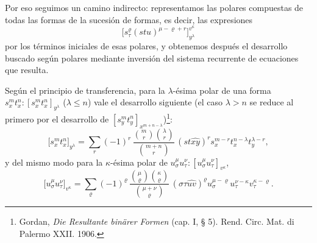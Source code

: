 \documentclass[11pt]{article}
\begin{document}
Por eso seguimos un camino indirecto: representamos las polares compuestas de todas las formas de la sucesión de formas, es decir, las expresiones
\[
\bigl[s_\tau^\varrho(stu)^{\mu-\varrho+r}\bigr]_{y^\lambda}^{v^\kappa}
\]
por los términos iniciales de esas polares, y obtenemos después el desarrollo buscado según polares mediante inversión del sistema recurrente de ecuaciones que resulta.

Según el principio de transferencia, para la $\lambda$-ésima polar de una forma $s_x^m t_x^n:[s_x^m t_x^n]_{y^\lambda}$ ($\lambda\le n$) vale el desarrollo siguiente (el caso $\lambda>n$ se reduce al primero por el desarrollo de $[s_y^m t_y^n]_{x^{m+n-\lambda}}$)\footnote{Gordan, \emph{Die Resultante binärer Formen} (cap. I, § 5). Rend. Circ. Mat. di Palermo XXII. 1906.}:
\[
\bigl[s_x^m t_x^n\bigr]_{y^\lambda}
=\sum_r (-1)^r\,
\frac{\binom{m}{r}\binom{\lambda}{r}}{\binom{m+n}{r}}\,
(st\widehat{xy})^r s_x^{m-r}t_x^{n-\lambda}t_y^{\lambda-r},
\]
y del mismo modo para la $\kappa$-ésima polar de $u_\sigma^\mu u_\tau^\nu:[u_\sigma^\mu u_\tau^\nu]_{v^\kappa}$,
\[
\bigl[u_\sigma^\mu u_\tau^\nu\bigr]_{v^\kappa}
=\sum_\varrho (-1)^\varrho\,
\frac{\binom{\mu}{\varrho}\binom{\kappa}{\varrho}}{\binom{\mu+\nu}{\varrho}}\,
(\sigma\tau\widehat{uv})^\varrho u_\sigma^{\mu-\varrho}u_\tau^{\nu-\kappa}v_\tau^{\kappa-\varrho}.
\]
\end{document}
